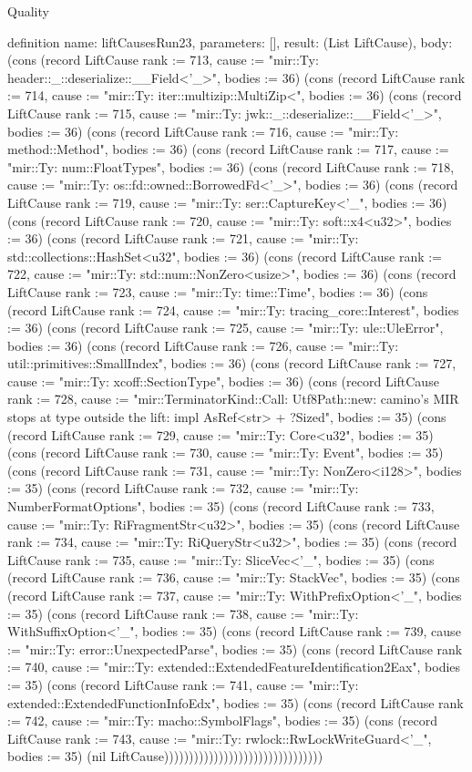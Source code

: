 \begin{lexlean}{Quality}
\begin{semanticmodule}
definition{
  name: liftCausesRun23,
  parameters: [],
  result: (List LiftCause),
  body: (cons (record LiftCause {rank := 713, cause := "mir::Ty: header::_::deserialize::__Field<'_>", bodies := 36}) (cons (record LiftCause {rank := 714, cause := "mir::Ty: iter::multizip::MultiZip<", bodies := 36}) (cons (record LiftCause {rank := 715, cause := "mir::Ty: jwk::_::deserialize::__Field<'_>", bodies := 36}) (cons (record LiftCause {rank := 716, cause := "mir::Ty: method::Method", bodies := 36}) (cons (record LiftCause {rank := 717, cause := "mir::Ty: num::FloatTypes", bodies := 36}) (cons (record LiftCause {rank := 718, cause := "mir::Ty: os::fd::owned::BorrowedFd<'_>", bodies := 36}) (cons (record LiftCause {rank := 719, cause := "mir::Ty: ser::CaptureKey<'_", bodies := 36}) (cons (record LiftCause {rank := 720, cause := "mir::Ty: soft::x4<u32>", bodies := 36}) (cons (record LiftCause {rank := 721, cause := "mir::Ty: std::collections::HashSet<u32", bodies := 36}) (cons (record LiftCause {rank := 722, cause := "mir::Ty: std::num::NonZero<usize>", bodies := 36}) (cons (record LiftCause {rank := 723, cause := "mir::Ty: time::Time", bodies := 36}) (cons (record LiftCause {rank := 724, cause := "mir::Ty: tracing_core::Interest", bodies := 36}) (cons (record LiftCause {rank := 725, cause := "mir::Ty: ule::UleError", bodies := 36}) (cons (record LiftCause {rank := 726, cause := "mir::Ty: util::primitives::SmallIndex", bodies := 36}) (cons (record LiftCause {rank := 727, cause := "mir::Ty: xcoff::SectionType", bodies := 36}) (cons (record LiftCause {rank := 728, cause := "mir::TerminatorKind::Call: Utf8Path::new: camino's MIR stops at type outside the lift: impl AsRef<str> + ?Sized", bodies := 35}) (cons (record LiftCause {rank := 729, cause := "mir::Ty: Core<u32", bodies := 35}) (cons (record LiftCause {rank := 730, cause := "mir::Ty: Event", bodies := 35}) (cons (record LiftCause {rank := 731, cause := "mir::Ty: NonZero<i128>", bodies := 35}) (cons (record LiftCause {rank := 732, cause := "mir::Ty: NumberFormatOptions", bodies := 35}) (cons (record LiftCause {rank := 733, cause := "mir::Ty: RiFragmentStr<u32>", bodies := 35}) (cons (record LiftCause {rank := 734, cause := "mir::Ty: RiQueryStr<u32>", bodies := 35}) (cons (record LiftCause {rank := 735, cause := "mir::Ty: SliceVec<'_", bodies := 35}) (cons (record LiftCause {rank := 736, cause := "mir::Ty: StackVec", bodies := 35}) (cons (record LiftCause {rank := 737, cause := "mir::Ty: WithPrefixOption<'_", bodies := 35}) (cons (record LiftCause {rank := 738, cause := "mir::Ty: WithSuffixOption<'_", bodies := 35}) (cons (record LiftCause {rank := 739, cause := "mir::Ty: error::UnexpectedParse", bodies := 35}) (cons (record LiftCause {rank := 740, cause := "mir::Ty: extended::ExtendedFeatureIdentification2Eax", bodies := 35}) (cons (record LiftCause {rank := 741, cause := "mir::Ty: extended::ExtendedFunctionInfoEdx", bodies := 35}) (cons (record LiftCause {rank := 742, cause := "mir::Ty: macho::SymbolFlags", bodies := 35}) (cons (record LiftCause {rank := 743, cause := "mir::Ty: rwlock::RwLockWriteGuard<'_", bodies := 35}) (nil LiftCause))))))))))))))))))))))))))))))))
}


\end{semanticmodule}
\end{lexlean}
